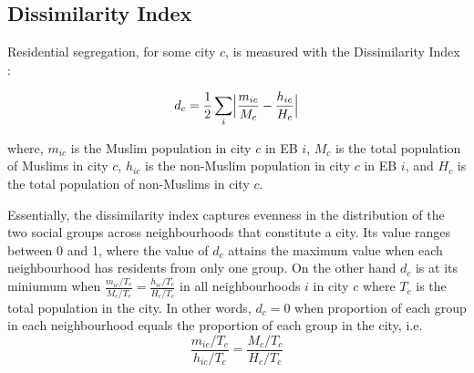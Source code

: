 \documentclass{article}
\begin{document}
\subsection*{Dissimilarity Index}

Residential segregation, for some city $c$, is measured with the Dissimilarity Index \citep{massey.2018}:

\begin{equation}\label{eq:dis_index}
d_c = \frac{1}{2} \sum_i \Bigl|\frac{m_{ic}}{M_c} - \frac{h_{ic}}{H_c}\Bigr|
\end{equation}

where, $m_{ic}$ is the Muslim population in city $c$ in EB $i$, $M_c$ is the total population of Muslims in city $c$, $h_{ic}$ is the non-Muslim population in city $c$ in EB $i$, and $H_c$ is the total population of non-Muslims in city $c$.

Essentially, the dissimilarity index captures evenness in the distribution of the two social groups across neighbourhoods that constitute a city. Its value ranges between 0 and 1, where the value of $d_c$ attains the maximum value when each neighbourhood has residents from only one group. On the other hand $d_c$ is at its miniumum when $\frac{m_{ic} / T_c}{M_c / T_c} = \frac{h_{ic} / T_c}{H_c / T_c}$ in all neighbourhoods $i$ in city $c$ where $T_c$ is the total population in the city. In other words, $d_c = 0$ when  proportion of each group in each neighbourhood equals the proportion of each group in the city, i.e. 
$$\frac{m_{ic} / T_c}{h_{ic} / T_c} = \frac{M_c / T_c}{H_c / T_c}$$
\end{document}
